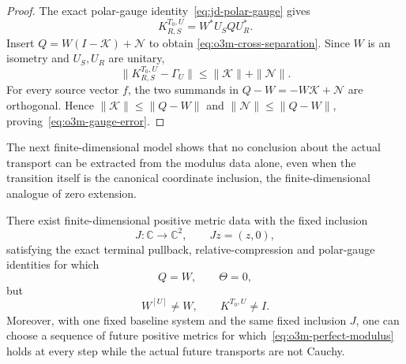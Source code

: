 \begin{proof}
The exact polar-gauge identity~\eqref{eq:jd-polar-gauge} gives
\[
 K_{R,S}^{T_0,U}=W^*U_SQU_R^*.
\]
Insert $Q=W(I-\mathscr K)+\mathscr N$ to obtain
\eqref{eq:o3m-cross-separation}.  Since $W$ is an isometry and $U_S,U_R$ are unitary,
\[
 \|K_{R,S}^{T_0,U}-\Gamma_U\|
 \le\|\mathscr K\|+\|\mathscr N\|.
\]
For every source vector $f$, the two summands in
$Q-W=-W\mathscr K+\mathscr N$ are orthogonal.  Hence
$\|\mathscr K\|\le\|Q-W\|$ and
$\|\mathscr N\|\le\|Q-W\|$, proving~\eqref{eq:o3m-gauge-error}.
\end{proof}

The next finite-dimensional model shows that no conclusion about the actual transport
can be extracted from the modulus data alone, even when the transition itself is the
canonical coordinate inclusion, the finite-dimensional analogue of zero extension.

\begin{proposition}
\label{prop:o3m-countermodel}
There exist finite-dimensional positive metric data with the fixed inclusion
\[
 J:\mathbb C\longrightarrow\mathbb C^2,
 \qquad Jz=(z,0),
\]
satisfying the exact terminal pullback, relative-compression and polar-gauge identities
for which
\[
 \boxed{Q=W,\qquad \Theta=0,}
\tag{O3M.4}\label{eq:o3m-perfect-modulus}
\]
but
\[
 \boxed{W^{[U]}\ne W,\qquad K^{T_0,U}\ne I.}
\tag{O3M.5}\label{eq:o3m-nontrivial-gauge}
\]
Moreover, with one fixed baseline system and the same fixed inclusion $J$, one can
choose a sequence of future positive metrics for which~\eqref{eq:o3m-perfect-modulus}
holds at every step while the actual future transports are not Cauchy.
\end{proposition}

